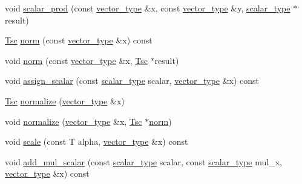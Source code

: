 \begin{DoxyCompactItemize}
\item 
void \hyperlink{structgpu__vector__operations_a63fcf4f0c16421d1659d36c9b3c2885a}{scalar\-\_\-prod} (const \hyperlink{structgpu__vector__operations_adfa9fd444da5616e33af37604dc206ba}{vector\-\_\-type} \&x, const \hyperlink{structgpu__vector__operations_adfa9fd444da5616e33af37604dc206ba}{vector\-\_\-type} \&y, \hyperlink{structgpu__vector__operations_aaa9d1dc877967fabc2262c4a25e4796f}{scalar\-\_\-type} $\ast$result)
\item 
\hyperlink{structgpu__vector__operations_a1a029004898ae03eae1de4c8c8f4f824}{Tsc} \hyperlink{structgpu__vector__operations_a187c29c17f590d11a2d0ab6470b4d435}{norm} (const \hyperlink{structgpu__vector__operations_adfa9fd444da5616e33af37604dc206ba}{vector\-\_\-type} \&x) const 
\item 
void \hyperlink{structgpu__vector__operations_a1a50ed9cb4bc573f5425b83797471cc7}{norm} (const \hyperlink{structgpu__vector__operations_adfa9fd444da5616e33af37604dc206ba}{vector\-\_\-type} \&x, \hyperlink{structgpu__vector__operations_a1a029004898ae03eae1de4c8c8f4f824}{Tsc} $\ast$result)
\item 
void \hyperlink{structgpu__vector__operations_a1a2ea72c7a7d7fcd116a9dd1fcd17ba2}{assign\-\_\-scalar} (const \hyperlink{structgpu__vector__operations_aaa9d1dc877967fabc2262c4a25e4796f}{scalar\-\_\-type} scalar, \hyperlink{structgpu__vector__operations_adfa9fd444da5616e33af37604dc206ba}{vector\-\_\-type} \&x) const 
\item 
\hyperlink{structgpu__vector__operations_a1a029004898ae03eae1de4c8c8f4f824}{Tsc} \hyperlink{structgpu__vector__operations_a36d7b206953a416330293bb1085c9de5}{normalize} (\hyperlink{structgpu__vector__operations_adfa9fd444da5616e33af37604dc206ba}{vector\-\_\-type} \&x)
\item 
void \hyperlink{structgpu__vector__operations_a7727bb69249317db563120c706c5957b}{normalize} (\hyperlink{structgpu__vector__operations_adfa9fd444da5616e33af37604dc206ba}{vector\-\_\-type} \&x, \hyperlink{structgpu__vector__operations_a1a029004898ae03eae1de4c8c8f4f824}{Tsc} $\ast$\hyperlink{structgpu__vector__operations_a187c29c17f590d11a2d0ab6470b4d435}{norm})
\item 
void \hyperlink{structgpu__vector__operations_a28afad45b1278e62d77fa96b21a8defa}{scale} (const T alpha, \hyperlink{structgpu__vector__operations_adfa9fd444da5616e33af37604dc206ba}{vector\-\_\-type} \&x) const 
\item 
void \hyperlink{structgpu__vector__operations_aa5793a20d37aeab2a382c5d26b804e95}{add\-\_\-mul\-\_\-scalar} (const \hyperlink{structgpu__vector__operations_aaa9d1dc877967fabc2262c4a25e4796f}{scalar\-\_\-type} scalar, const \hyperlink{structgpu__vector__operations_aaa9d1dc877967fabc2262c4a25e4796f}{scalar\-\_\-type} mul\-\_\-x, \hyperlink{structgpu__vector__operations_adfa9fd444da5616e33af37604dc206ba}{vector\-\_\-type} \&x) const 

\end{DoxyCompactItemize}
